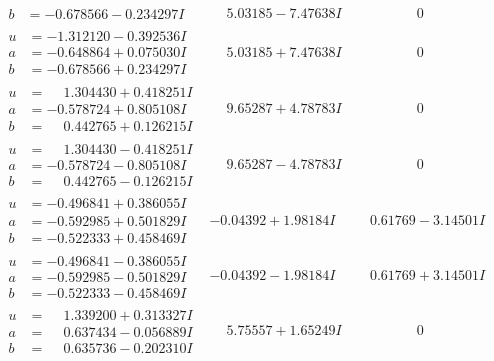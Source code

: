 \documentclass[1p]{elsarticle_modified}
\theoremstyle{definition}
\begin{document}
$$\begin{array}{c|c|c}
\begin{aligned}
b &= -0.678566 - 0.234297 I\end{aligned}
 & \phantom{-}5.03185 - 7.47638 I & \phantom{-0.000000 } 0 \\ \hline\begin{aligned}
u &= -1.312120 - 0.392536 I \\
a &= -0.648864 + 0.075030 I \\
b &= -0.678566 + 0.234297 I\end{aligned}
 & \phantom{-}5.03185 + 7.47638 I & \phantom{-0.000000 } 0 \\ \hline\begin{aligned}
u &= \phantom{-}1.304430 + 0.418251 I \\
a &= -0.578724 + 0.805108 I \\
b &= \phantom{-}0.442765 + 0.126215 I\end{aligned}
 & \phantom{-}9.65287 + 4.78783 I & \phantom{-0.000000 } 0 \\ \hline\begin{aligned}
u &= \phantom{-}1.304430 - 0.418251 I \\
a &= -0.578724 - 0.805108 I \\
b &= \phantom{-}0.442765 - 0.126215 I\end{aligned}
 & \phantom{-}9.65287 - 4.78783 I & \phantom{-0.000000 } 0 \\ \hline\begin{aligned}
u &= -0.496841 + 0.386055 I \\
a &= -0.592985 + 0.501829 I \\
b &= -0.522333 + 0.458469 I\end{aligned}
 & -0.04392 + 1.98184 I & \phantom{-}0.61769 - 3.14501 I \\ \hline\begin{aligned}
u &= -0.496841 - 0.386055 I \\
a &= -0.592985 - 0.501829 I \\
b &= -0.522333 - 0.458469 I\end{aligned}
 & -0.04392 - 1.98184 I & \phantom{-}0.61769 + 3.14501 I \\ \hline\begin{aligned}
u &= \phantom{-}1.339200 + 0.313327 I \\
a &= \phantom{-}0.637434 - 0.056889 I \\
b &= \phantom{-}0.635736 - 0.202310 I\end{aligned}
 & \phantom{-}5.75557 + 1.65249 I & \phantom{-0.000000 } 0 \\ \hline\begin{aligned}

\end{aligned}
\end{array}$$
\end{document}
